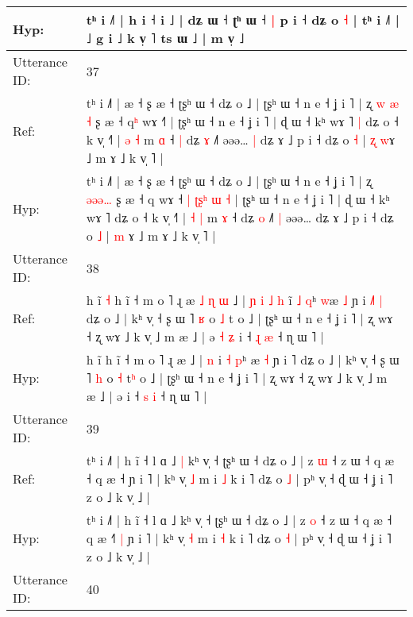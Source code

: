 \documentclass[10pt]{article}
\DeclareRobustCommand{\hl}[1]{{\textcolor{red}{#1}}}
\begin{document}
\begin{longtable}{ll}
 \\
Hyp: & tʰ i ˩˥ | h i ˧\hl{}\hl{}\hl{}\hl{}\hl{}\hl{}\hl{}\hl{} i ˩ | dʑ ɯ ˧ ʈʰ ɯ ˧\hl{ }\hl{|} p i ˧ dʑ o \hl{˧} | tʰ i ˩˥ |\hl{}\hl{}\hl{}\hl{} ˩ g i ˩ k v̩ ˥ ts ɯ ˩ | m v̩ ˩
 \\
\midrule
Utterance ID: & 37 \\
Ref: & tʰ i ˩˥ | æ ˧ ʂ æ ˧ ʈʂʰ ɯ ˧ dʑ o ˩ | ʈʂʰ ɯ ˧ n e ˧ ʝ i ˥ | ʐ \hl{w}\hl{ }\hl{æ}\hl{ }\hl{˧} ʂ æ ˧ q\hl{ʰ} wɤ ˧\hl{}\hl{}\hl{}\hl{}\hl{}\hl{}\hl{}\hl{}\hl{}\hl{˥} | ʈʂʰ ɯ ˧ n e ˧ ʝ i ˥ | ɖ ɯ ˧ kʰ wɤ ˥\hl{ }\hl{|} dʑ o ˧ k v̩ ˧˥ | \hl{ə} \hl{˧} m \hl{ɑ} ˧\hl{ }\hl{|} dʑ \hl{ɤ} ˩˥\hl{}\hl{} əəə…\hl{ }\hl{|} dʑ ɤ ˩ p i ˧ dʑ o \hl{˧} | \hl{ʐ} \hl{w}ɤ ˩ m ɤ ˩ k v̩ ˥ |
 \\
Hyp: & tʰ i ˩˥ | æ ˧ ʂ æ ˧ ʈʂʰ ɯ ˧ dʑ o ˩ | ʈʂʰ ɯ ˧ n e ˧ ʝ i ˥ | ʐ \hl{}\hl{ə}\hl{ə}\hl{ə}\hl{…} ʂ æ ˧ q\hl{} wɤ ˧\hl{ }\hl{|}\hl{ }\hl{ʈ}\hl{ʂ}\hl{ʰ}\hl{ }\hl{ɯ}\hl{ }\hl{˧} | ʈʂʰ ɯ ˧ n e ˧ ʝ i ˥ | ɖ ɯ ˧ kʰ wɤ ˥\hl{}\hl{} dʑ o ˧ k v̩ ˧˥ | \hl{˧} \hl{|} m \hl{ɤ} ˧\hl{}\hl{} dʑ \hl{o} ˩˥\hl{ }\hl{|} əəə…\hl{}\hl{} dʑ ɤ ˩ p i ˧ dʑ o \hl{˩} | \hl{m} \hl{}ɤ ˩ m ɤ ˩ k v̩ ˥ |
 \\
\midrule
Utterance ID: & 38 \\
Ref: & h ĩ\hl{ }\hl{˧} h ĩ ˧ m o ˥ ɻ æ\hl{ }\hl{˩}\hl{ }\hl{ɳ}\hl{ }\hl{ɯ} ˩ |\hl{ }\hl{ɲ}\hl{ }\hl{i}\hl{ }\hl{˩} \hl{h} i\hl{̃} \hl{˩} \hl{q}ʰ \hl{w}æ \hl{˩} ɲ i \hl{˩}˥\hl{ }\hl{|} dʑ o ˩ | kʰ v̩ ˧ ʂ ɯ ˥ \hl{ʁ} o \hl{˩} t\hl{} o ˩ | ʈʂʰ ɯ ˧ n e ˧ ʝ i ˥ | ʐ wɤ ˧ ʐ wɤ ˩ k v̩ ˩ m æ ˩ | ə\hl{ }\hl{˧}\hl{ }\hl{ʑ} i ˧ \hl{ɻ} \hl{æ} ˧ ɳ ɯ ˥ |
 \\
Hyp: & h ĩ\hl{}\hl{} h ĩ ˧ m o ˥ ɻ æ\hl{}\hl{}\hl{}\hl{}\hl{}\hl{} ˩ |\hl{}\hl{}\hl{}\hl{}\hl{}\hl{} \hl{n} i\hl{} \hl{˧} \hl{p}ʰ \hl{}æ \hl{˧} ɲ i \hl{}˥\hl{}\hl{} dʑ o ˩ | kʰ v̩ ˧ ʂ ɯ ˥ \hl{h} o \hl{˧} t\hl{ʰ} o ˩ | ʈʂʰ ɯ ˧ n e ˧ ʝ i ˥ | ʐ wɤ ˧ ʐ wɤ ˩ k v̩ ˩ m æ ˩ | ə\hl{}\hl{}\hl{}\hl{} i ˧ \hl{s} \hl{i} ˧ ɳ ɯ ˥ |
 \\
\midrule
Utterance ID: & 39 \\
Ref: & tʰ i ˩˥ | h ĩ ˧ l ɑ ˩\hl{ }\hl{|} kʰ v̩ ˧ ʈʂʰ ɯ ˧ dʑ o ˩ | z \hl{ɯ} ˧ z ɯ ˧ q æ ˧ q æ ˧\hl{}\hl{}\hl{} ɲ i ˥ | kʰ v̩ \hl{˩} m i \hl{˩} k i ˥ dʑ o \hl{˩} | pʰ v̩ ˧ ɖ ɯ ˧ ʝ i ˥ z o ˩ k v̩ ˩ |
 \\
Hyp: & tʰ i ˩˥ | h ĩ ˧ l ɑ ˩\hl{}\hl{} kʰ v̩ ˧ ʈʂʰ ɯ ˧ dʑ o ˩ | z \hl{o} ˧ z ɯ ˧ q æ ˧ q æ ˧\hl{˥}\hl{ }\hl{|} ɲ i ˥ | kʰ v̩ \hl{˧} m i \hl{˧} k i ˥ dʑ o \hl{˧} | pʰ v̩ ˧ ɖ ɯ ˧ ʝ i ˥ z o ˩ k v̩ ˩ |
 \\
\midrule
Utterance ID: & 40 \\

\end{longtable}
\end{document}
